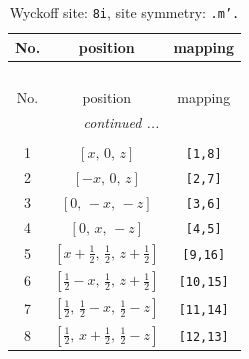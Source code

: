 \documentclass[fleqn,8pt]{jsarticle}
\begin{document}
\begin{longtable}{ccc}
\caption{Wyckoff site: {\tt 8i}, site symmetry: {\tt .m'.}}
 \\
 \hline \hline
No. & position & mapping \\ \hline \endfirsthead

\multicolumn{2}{l}{\tablename\ \thetable{}} \\
 \hline \hline
No. & position & mapping \\ \hline \endhead

 \hline \hline
\multicolumn{2}{r}{\footnotesize\it continued ...} \\ \endfoot

 \hline \hline
\multicolumn{2}{r}{} \\ \endlastfoot

1 & $\left[ x,\, 0,\, z \right]$ & {\tt [1,8]} \\ \hline
2 & $\left[ - x,\, 0,\, z \right]$ & {\tt [2,7]} \\ \hline
3 & $\left[ 0,\, - x,\, - z \right]$ & {\tt [3,6]} \\ \hline
4 & $\left[ 0,\, x,\, - z \right]$ & {\tt [4,5]} \\ \hline
5 & $\left[ x + \frac{1}{2},\, \frac{1}{2},\, z + \frac{1}{2} \right]$ & {\tt [9,16]} \\ \hline
6 & $\left[ \frac{1}{2} - x,\, \frac{1}{2},\, z + \frac{1}{2} \right]$ & {\tt [10,15]} \\ \hline
7 & $\left[ \frac{1}{2},\, \frac{1}{2} - x,\, \frac{1}{2} - z \right]$ & {\tt [11,14]} \\ \hline
8 & $\left[ \frac{1}{2},\, x + \frac{1}{2},\, \frac{1}{2} - z \right]$ & {\tt [12,13]} \\
\end{longtable}
\renewcommand{\arraystretch}{1.2}
\end{document}
